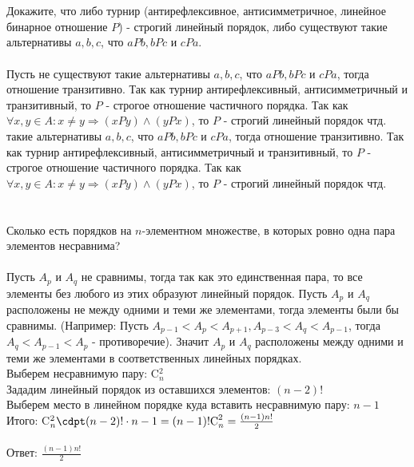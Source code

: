 \documentclass{article}
\begin{document}
\section{}
Докажите, что либо турнир (антирефлексивное, антисимметричное, линейное бинарное отношение $P$) - строгий линейный порядок, либо существуют такие альтернативы $a,b,c$, что $aPb,bPc$ и $cPa$.
\\\\
Пусть не существуют такие альтернативы $a,b,c$, что $aPb,bPc$ и $cPa$, тогда отношение транзитивно. Так как турнир антирефлексивный, антисимметричный и транзитивный, то $P$ - строгое отношение частичного порядка. Так как $\forall x,y \in A: x\neq y \Rightarrow (xPy) \wedge (yPx)$, то $P$ - строгий линейный порядок чтд.
 такие альтернативы $a,b,c$, что $aPb,bPc$ и $cPa$, тогда отношение транзитивно. Так как турнир антирефлексивный, антисимметричный и транзитивный, то $P$ - строгое отношение частичного порядка. Так как $\forall x,y \in A: x\neq y \Rightarrow (xPy) \wedge (yPx)$, то $P$ - строгий линейный порядок чтд.
\section{}
Сколько есть порядков на $n$-элементном множестве, в которых ровно одна пара элементов несравнима?\\\\
Пусть $A_p$ и $A_q$ не сравнимы, тогда так как это единственная пара, то все элементы без любого из этих образуют линейный порядок. Пусть $A_p$ и $A_q$ расположены не между одними и теми же элементами, тогда элементы были бы сравнимы. (Например: Пусть $A_{p-1}<A_p<A_{p+1}, A_{p-3}< A_q < A_{p-1}$, тогда $A_q < A_{p-1}<A_p$ - противоречие). Значит $A_p$ и $A_q$ расположены между одними и теми же элементами в соответственных линейных порядках.\\
Выберем несравнимую пару: C$^2_n$\\
Зададим линейный порядок из оставшихся элементов: $(n-2)!$\\
Выберем место в линейном порядке куда вставить несравнимую пару: $n-1$\\
Итого: C$^2_n \cdpt (n-2)! \cdot n-1 = (n-1)!\text{C}^2_n = \frac{(n-1)n!}{2}$\\\\
Ответ: $\frac{(n-1)n!}{2}$
\end{document}
